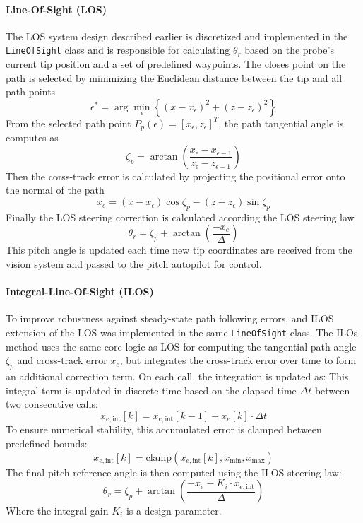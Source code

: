 \paragraph*{Line-Of-Sight (LOS)}
The LOS system design described earlier is discretized and implemented in the \texttt{LineOfSight} class and is responsible for calculating \(\theta_r\) based on the probe's current tip position and a set of predefined waypoints. The closes point on the path is selected by minimizing the Euclidean distance between the tip and all path points
\begin{equation}
\epsilon^* = \arg\min_\epsilon \left\{ (x - x_\epsilon)^2 + (z - z_\epsilon)^2 \right\}
\end{equation}
From the selected path point \(P_p(\epsilon) = [x_\epsilon, z_\epsilon]^T\), the path tangential angle is computes as 
\begin{equation}
\zeta_p = \arctan\left(\frac{x_\epsilon - x_{\epsilon-1}}{z_\epsilon - z_{\epsilon-1}}\right)
\end{equation}
Then the corss-track error is calculated by projecting the positional error onto the normal of the path
\begin{equation}
    x_e = (x - x_\epsilon)\cos\zeta_p - (z - z_\epsilon)\sin\zeta_p
\end{equation}
Finally the LOS steering correction is calculated according the LOS steering law 
\begin{equation}
    \theta_r = \zeta_p + \arctan\left(\frac{-x_e}{\Delta}\right)
\end{equation}
This pitch angle is updated each time new tip coordinates are received from the vision system and passed to the pitch autopilot for control.


\paragraph*{Integral-Line-Of-Sight (ILOS)}
To improve robustness against steady-state path following errors, and ILOS extension of the LOS was implemented in the same \texttt{LineOfSight} class. The ILOs method uses the same core logic as LOS for computing the tangential path angle \(\zeta_p\) and cross-track error \(x_e\), but integrates the cross-track error over time to form an additional correction term. On each call, the integration is updated as:
This integral term is updated in discrete time based on the elapsed time \(\Delta t\) between two consecutive calls:
\begin{equation}
x_{e,\text{int}}[k] = x_{e,\text{int}}[k-1] + x_e[k] \cdot \Delta t
\end{equation}
To ensure numerical stability, this accumulated error is clamped between predefined bounds:
\begin{equation}
x_{e,\text{int}}[k] = \text{clamp}\left(x_{e,\text{int}}[k], x_{\text{min}}, x_{\text{max}}\right)
\end{equation}
The final pitch reference angle is then computed using the ILOS steering law:
\begin{equation}
    \theta_r = \zeta_p + \arctan\left(\frac{-x_e - K_i \cdot x_{e,\text{int}}}{\Delta}\right)
\end{equation}
Where the integral gain \(K_i\) is a design parameter.

